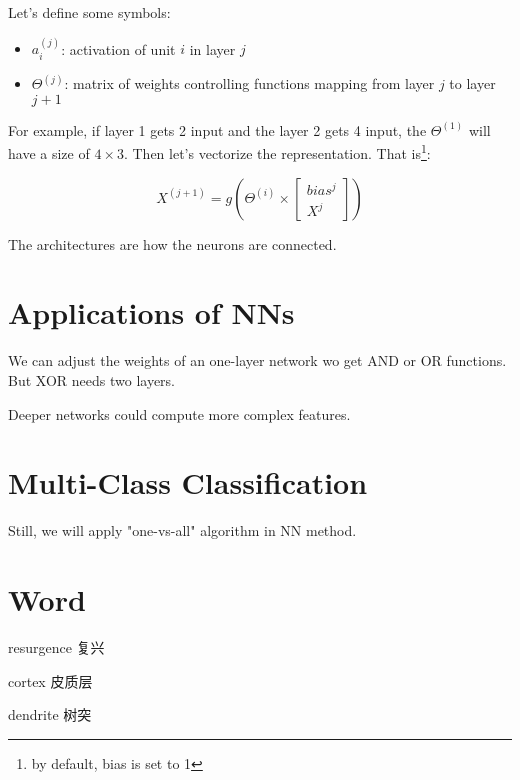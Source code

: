 \documentclass[en,11pt,english,black,simple]{../elegantbook}
\begin{document}
Let's define some symbols:
\begin{itemize}
    \item \(a_i^{(j)}\): activation of unit \(i\) in layer \(j\)
    \item \(\Theta^{(j)}\): matrix of weights controlling functions mapping from layer \(j\) to layer \(j+1\)
\end{itemize}

For example, if layer 1 gets 2 input and the layer 2 gets 4 input, the \(\Theta^{(1)}\) will have a size of \(4 \times 3\). Then let's vectorize the representation. That is\footnote{by default, bias is set to 1}: 

\[X^{(j+1)} = g \left(\Theta^{(i)} \times \left[\begin{aligned}
    bias^j\\
    X^j    
\end{aligned}\right]\right)\]

The architectures are how the neurons are connected.

\section{Applications of NNs}

We can adjust the weights of an one-layer network wo get AND or OR functions. But XOR needs two layers. 

Deeper networks could compute more complex features.

\section{Multi-Class Classification}

Still, we will apply "one-vs-all" algorithm in NN method.




\section*{Word}

resurgence 复兴

cortex 皮质层

dendrite 树突

\let\chapname\undefined
\ifx\mainclass\undefined
\end{document}
